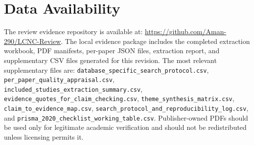 \documentclass[conference]{IEEEtran}
\begin{document}
\section*{Data Availability}
The review evidence repository is available at: \url{https://github.com/Aman-290/LCNC-Review}. The local evidence package includes the completed extraction workbook, PDF manifests, per-paper JSON files, extraction report, and supplementary CSV files generated for this revision. The most relevant supplementary files are: \texttt{database\_specific\_search\_protocol.csv}, \texttt{per\_paper\_quality\_appraisal.csv}, \texttt{included\_studies\_extraction\_summary.csv}, \texttt{evidence\_quotes\_for\_claim\_checking.csv}, \texttt{theme\_synthesis\_matrix.csv}, \texttt{claim\_to\_evidence\_map.csv}, \texttt{search\_protocol\_and\_reproducibility\_log.csv}, and \texttt{prisma\_2020\_checklist\_working\_table.csv}. Publisher-owned PDFs should be used only for legitimate academic verification and should not be redistributed unless licensing permits it.
\end{document}

